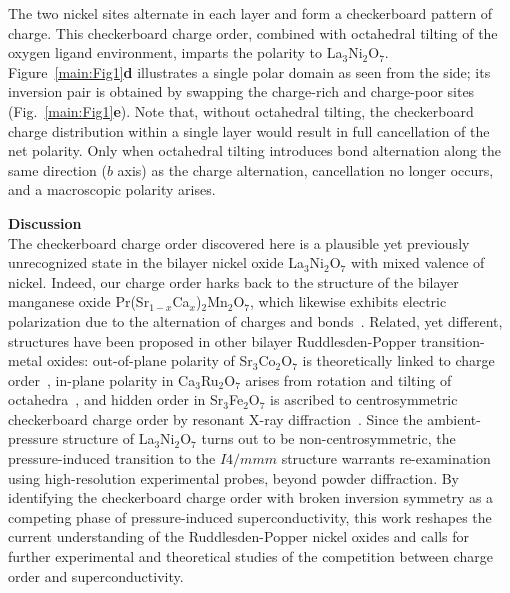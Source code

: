 \documentclass[aps,12pt,floatfix,longbibliography,a4paper]{revtex4-2}
\newcommand{\LNO}{La$_3$Ni$_2$O$_7$}
\begin{document}
The two nickel sites alternate in each layer and form a checkerboard pattern of charge. This checkerboard charge order, combined with octahedral tilting of the oxygen ligand environment, imparts the polarity to \LNO{}. Figure~\ref{main:Fig1}\textbf{d} illustrates a single polar domain as seen from the side; its inversion pair is obtained by swapping the charge-rich and charge-poor sites (Fig.~\ref{main:Fig1}\textbf{e}). Note that, without octahedral tilting, the checkerboard charge distribution within a single layer would result in full cancellation of the net polarity. Only when octahedral tilting introduces bond alternation along the same direction ($b$ axis) as the charge alternation, cancellation no longer occurs, and a macroscopic polarity arises.

\bigskip
\textbf{Discussion}\\
The checkerboard charge order discovered here is a plausible yet previously unrecognized state in the bilayer nickel oxide \LNO{} with mixed valence of nickel. Indeed, our charge order harks back to the structure of the bilayer manganese oxide Pr(Sr$_{1-x}$Ca$_x$)$_2$Mn$_2$O$_7$, which likewise exhibits electric polarization due to the alternation of charges and bonds~\cite{Tokunaga2006-bz}. Related, yet different, structures have been proposed in other bilayer Ruddlesden-Popper transition-metal oxides: out-of-plane polarity of Sr$_3$Co$_2$O$_7$ is theoretically linked to charge order~\cite{Zhou2026-uk,Huang2026-ax}, in-plane polarity in Ca$_3$Ru$_2$O$_7$ arises from rotation and tilting of octahedra~\cite{Lei2018-lg}, and hidden order in Sr$_3$Fe$_2$O$_7$ is ascribed to centrosymmetric checkerboard charge order by resonant X-ray diffraction~\cite{Kim2021-vw}. 
Since the ambient-pressure structure of \LNO{} turns out to be non-centrosymmetric, the pressure-induced transition to the $I4/mmm$ structure warrants re-examination using high-resolution experimental probes, beyond powder diffraction. By identifying the checkerboard charge order with broken inversion symmetry as a competing phase of pressure-induced superconductivity, this work reshapes the current understanding of the Ruddlesden-Popper nickel oxides and calls for further experimental and theoretical studies of the competition between charge order and superconductivity.

\newpage


\newpage

\clearpage
\end{document}
